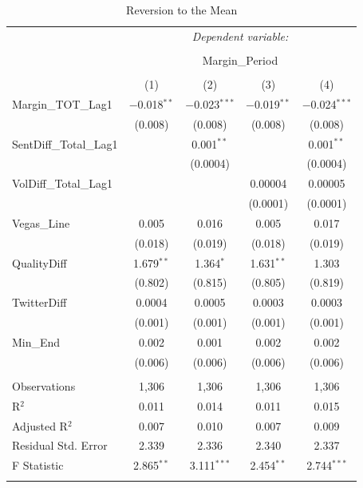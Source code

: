 \documentclass[12pt]{article}
\begin{document}
\begin{doublespacing}
\begin{table}[H] 
\centering 
\caption{Reversion to the Mean} 
\label{} 
\begin{tabular*}{\textwidth}{@{\extracolsep{\fill}}lcccc} 
\hline 
\hline
 & \multicolumn{4}{c}{\textit{Dependent variable:}} \\ 
\cline{2-5} 
\\[-3.0ex] & \multicolumn{4}{c}{Margin\_Period} \\ 
\\[-1.5ex] & (1) & (2) & (3) & (4)\\ 
\hline
 Margin\_TOT\_Lag1 & $-$0.018$^{**}$ & $-$0.023$^{***}$ & $-$0.019$^{**}$ & $-$0.024$^{***}$ \\ 
  & (0.008) & (0.008) & (0.008) & (0.008) \\ 
 SentDiff\_Total\_Lag1 &  & 0.001$^{**}$ &  & 0.001$^{**}$ \\ 
  &  & (0.0004) &  & (0.0004) \\ 
 VolDiff\_Total\_Lag1 &  &  & 0.00004 & 0.00005 \\ 
  &  &  & (0.0001) & (0.0001) \\ 
 Vegas\_Line & 0.005 & 0.016 & 0.005 & 0.017 \\ 
  & (0.018) & (0.019) & (0.018) & (0.019) \\ 
 QualityDiff & 1.679$^{**}$ & 1.364$^{*}$ & 1.631$^{**}$ & 1.303 \\ 
  & (0.802) & (0.815) & (0.805) & (0.819) \\ 
 TwitterDiff & 0.0004 & 0.0005 & 0.0003 & 0.0003 \\ 
  & (0.001) & (0.001) & (0.001) & (0.001) \\ 
 Min\_End & 0.002 & 0.001 & 0.002 & 0.002 \\ 
  & (0.006) & (0.006) & (0.006) & (0.006) \\ 
\hline \\[-1.8ex] 
Observations & 1,306 & 1,306 & 1,306 & 1,306 \\ 
R$^{2}$ & 0.011 & 0.014 & 0.011 & 0.015 \\ 
Adjusted R$^{2}$ & 0.007 & 0.010 & 0.007 & 0.009 \\ 
Residual Std. Error & 2.339 & 2.336 & 2.340 & 2.337 \\ 
F Statistic & 2.865$^{**}$ & 3.111$^{***}$ & 2.454$^{**}$ & 2.744$^{***}$ \\ 
\hline 
\hline \\[-1.8ex] 
\end{tabular*} 
\end{table} 


\end{doublespacing}
\end{document}
